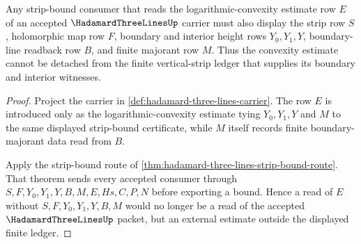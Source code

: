 \begin{theorem}
\label{thm:hadamard-three-lines-convexity-window}
Any strip-bound consumer that reads the logarithmic-convexity estimate row $E$ of an accepted $\HadamardThreeLinesUp$ carrier must also display the strip row $S$, holomorphic map row $F$, boundary and interior height rows $Y_0,Y_1,Y$, boundary-line readback row $B$, and finite majorant row $M$. Thus the convexity estimate cannot be detached from the finite vertical-strip ledger that supplies its boundary and interior witnesses.
\end{theorem}
\begin{proof}
Project the carrier in \autoref{def:hadamard-three-lines-carrier}. The row $E$ is introduced only as the logarithmic-convexity estimate tying $Y_0,Y_1,Y$ and $M$ to the same displayed strip-bound certificate, while $M$ itself records finite boundary-majorant data read from $B$.

Apply the strip-bound route of \autoref{thm:hadamard-three-lines-strip-bound-route}. That theorem sends every accepted consumer through $S,F,Y_0,Y_1,Y,B,M,E,Hs,C,P,N$ before exporting a bound. Hence a read of $E$ without $S,F,Y_0,Y_1,Y,B,M$ would no longer be a read of the accepted $\HadamardThreeLinesUp$ packet, but an external estimate outside the displayed finite ledger.
\end{proof}




